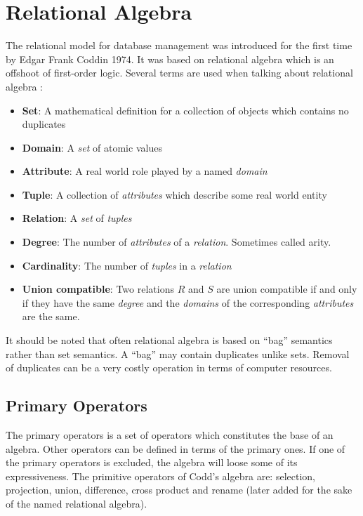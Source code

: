 \section{Relational Algebra}
\label{sect:theory:relAlg}

The relational model for database management was introduced for the first time by Edgar Frank Coddin
1974\cite{TDT4225}. It was based on relational algebra which is an offshoot of first-order logic. Several terms
are used when talking about relational algebra \cite{gordonRussel}\cite{newYorkDB}\cite{sudarshan}:
\begin{itemize}
\item \textbf{Set}: A mathematical definition for a collection of objects which contains no duplicates
\item \textbf{Domain}: A \textit{set} of atomic values
\item \textbf{Attribute}: A real world role played by a named \textit{domain}
\item \textbf{Tuple}: A collection of \textit{attributes} which describe some real world entity
\item \textbf{Relation}: A \textit{set} of \textit{tuples}
\item \textbf{Degree}: The number of \textit{attributes} of a \textit{relation}. Sometimes called arity.
\item \textbf{Cardinality}: The number of \textit{tuples} in a \textit{relation}
\item \textbf{Union compatible}: Two relations $R$ and $S$ are union compatible if and only if they have the same
	\textit{degree} and the \textit{domains} of the corresponding \textit{attributes} are the same.
\end{itemize}

It should be noted that often relational algebra is based on ``bag'' semantics rather than set semantics. A
``bag'' may contain duplicates unlike sets. Removal of duplicates can be a very costly operation in terms of
computer resources.

\subsection{Primary Operators}
\label{sect:theory:relAlg:primOper}
The primary operators is a set of operators which constitutes the base of an algebra. Other operators can be
defined in terms of the primary ones. If one of the primary operators is excluded, the algebra will loose some of
its expressiveness. The primitive operators of Codd's algebra are: selection, projection, union, difference,
cross product and rename (later added for the sake of the named relational algebra).

